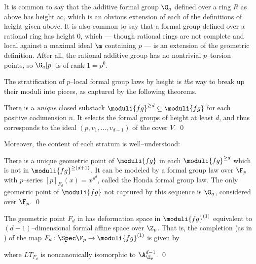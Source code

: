 \begin{remark}\label{ExceptionalAdditiveGps}
It is common to say that the additive formal group $\G_a$ defined over a ring $R$ as above has height $\infty$, which is an obvious extension of each of the definitions of height given above.  It is also common to say that a formal group defined over a rational ring has height $0$, which --- though rational rings are not complete and local against a maximal ideal $\m$ containing $p$ --- is an extension of the geometric definition.  After all, the rational additive group has no nontrivial $p$--torsion points, so $\G_a[p]$ is of rank $1 = p^0$.
\end{remark}

The stratification of $p$--local formal group laws by height is \emph{the} way to break up their moduli into pieces, as captured by the following theorems.

\begin{theorem}\label{LandweberIdealsTheorem}
There is a \emph{unique} closed substack $\moduli{fg}^{\ge d} \subseteq \moduli{fg}$ for each positive codimension $n$.  It selects the formal groups of height at least $d$, and thus corresponds to the ideal $(p, v_1, \ldots, v_{d-1})$ of the cover $V$. \qed
\end{theorem}

\noindent Moreover, the content of each stratum is well--understood:

\begin{theorem}\label{GeometricPointsOfMfg}
There is a unique geometric point of $\moduli{fg}$ in each $\moduli{fg}^{\ge d}$ which is not in $\moduli{fg}^{\ge(d+1)}$.  It can be modeled by a formal group law over $\F_p$ with $p$--series $[p]_{F_d}(x) = x^{p^d}$, called the Honda formal group law.  The only geometric point of $\moduli{fg}$ not captured by this sequence is $\G_a$, considered over $\F_p$. \qed
\end{theorem}

\begin{theorem}\label{LubinTate}
The geometric point $F_d$ in  has deformation space in $\moduli{fg}^{(1)}$ equivalent to $(d-1)$--dimensional formal affine space over $\Z_p$.  That is, the completion (as in ) of the map $F_d: \Spec \F_p \to \moduli{fg}^{(1)}$ is given by
\begin{center}
\end{center}
where $LT_{F_d}$ is noncanonically isomorphic to $\A^{d-1}_{\Z_p}$. \qed
\end{theorem}

